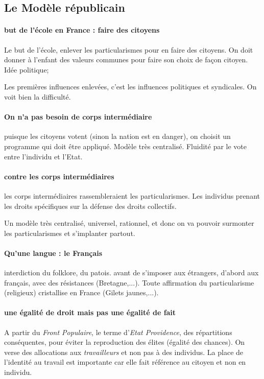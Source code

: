 \subsection{Le Modèle républicain}

\paragraph{but de l'école en France : faire des citoyens} Le but de l'école, enlever les particularismes pour en faire des citoyens. On doit donner à l'enfant des valeurs communes pour faire son choix de façon citoyen. Idée politique; 

\begin{Ex}
Les premières influences enlevées, c'est les influences politiques et syndicales. On voit bien la difficulté.
\end{Ex}

\paragraph{On n'a pas besoin de corps intermédiaire} puisque les citoyens votent (sinon la nation est en danger), on choisit un programme qui doit être appliqué. Modèle très centralisé. Fluidité par le vote entre l'individu et l'Etat. 

\paragraph{contre les corps intermédiaires} les corps intermédiaires rassembleraient les particularismes. Les individus prenant les droits spécifiques sur la défense des droits collectifs.

\begin{Synthesis}
Un modèle très centralisé, universel, rationnel, et donc on va pouvoir surmonter les particularismes et s'implanter partout. 

\end{Synthesis}

\paragraph{Qu'une langue : le Français} interdiction du folklore, du patois. avant de s'imposer aux étrangers, d'abord aux français, avec des résistances (Bretagne,...). Toute affirmation du particularisme (religieux) cristallise en France (Gilets jaunes,...). 

\paragraph{une égalité de droit mais pas une égalité de fait} A partir du \textit{Front Populaire}, le terme d'\textit{Etat Providence}, des répartitions conséquentes, pour éviter la reproduction des élites (égalité des chances).
On verse des allocations aux \textit{travailleurs} et non pas à des individus. La place de l'identité au travail est importante car elle fait référence au citoyen et non en individu. 

